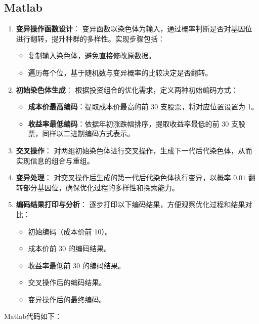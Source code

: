 \documentclass[journal,twoside,web]{ieeecolor}
\begin{document}
\subsection{Matlab}
\begin{enumerate}
    \item \textbf{变异操作函数设计}：  
    变异函数以染色体为输入，通过概率判断是否对基因位进行翻转，提升种群的多样性。实现步骤包括：
    \begin{itemize}
        \item 复制输入染色体，避免直接修改原数据。
        \item 遍历每个位，基于随机数与变异概率的比较决定是否翻转。
    \end{itemize}

    \item \textbf{初始染色体生成}：  
    根据投资组合的优化需求，定义两种初始编码方式：
    \begin{itemize}
        \item \textbf{成本价最高编码}：提取成本价最高的前 30 支股票，将对应位置设置为 1。
        \item \textbf{收益率最低编码}：依据年初涨跌幅排序，提取收益率最低的前 30 支股票，同样以二进制编码方式表示。
    \end{itemize}

    \item \textbf{交叉操作}：  
    对两组初始染色体进行交叉操作，生成下一代后代染色体，从而实现信息的组合与重组。

    \item \textbf{变异处理}：  
    对交叉操作后生成的第一代后代染色体执行变异，以概率 $0.01$ 翻转部分基因位，确保优化过程的多样性和探索能力。

    \item \textbf{编码结果打印与分析}：  
    逐步打印以下编码结果，方便观察优化过程和结果对比：
    \begin{itemize}
        \item 初始编码（成本价前 10）。
        \item 成本价前 30 的编码结果。
        \item 收益率最低前 30 的编码结果。
        \item 交叉操作后的编码结果。
        \item 变异操作后的最终编码。
    \end{itemize}
\end{enumerate}
Matlab代码如下：
\end{document}
